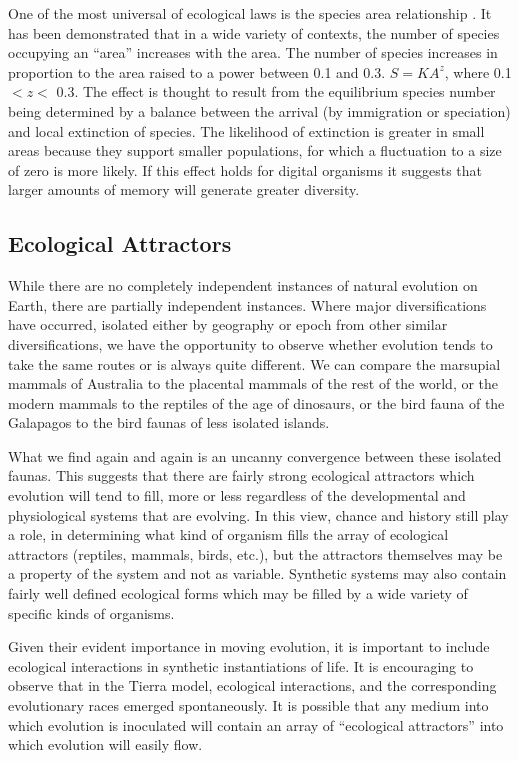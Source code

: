 One of the most universal of ecological laws is the species area relationship
\cite{MaWi}.  It has been demonstrated that in a wide variety of contexts,
the number of species occupying an ``area'' increases with the area.
The number of species increases in proportion to the area raised to a
power between 0.1 and 0.3.  $S = KA^{z}$, where 0.1 $< z <$ 0.3.  The
effect is thought to result from the equilibrium species number being
determined by a balance between the arrival (by immigration or speciation)
and local extinction of species.  The likelihood of extinction is greater
in small areas because they support smaller populations, for which a
fluctuation to a size of zero is more likely.  If this effect holds
for digital organisms it suggests that larger amounts of memory will
generate greater diversity.

\subsection{Ecological Attractors}

While there are no completely independent instances of natural evolution
on Earth, there are partially independent instances.  Where major
diversifications have occurred, isolated either by geography or epoch
from other similar diversifications, we have the opportunity to observe
whether evolution tends to take the same routes or is always quite
different.  We can compare the marsupial mammals of Australia to the
placental mammals of the rest of the world, or the modern mammals to
the reptiles of the age of dinosaurs, or the bird fauna of the Galapagos
to the bird faunas of less isolated islands.

What we find again and again is an uncanny convergence between these
isolated faunas.  This suggests that there are fairly strong ecological
attractors which evolution will tend to fill, more or less regardless
of the developmental and physiological systems that are evolving.
In this view, chance and history still play a role, in determining
what kind of organism fills the array of ecological attractors
(reptiles, mammals, birds, etc.), but the attractors themselves may
be a property of the system and not as variable.  Synthetic systems
may also contain fairly well defined ecological forms which may
be filled by a wide variety of specific kinds of organisms.

Given their evident importance in moving evolution, it is important
to include ecological interactions in synthetic instantiations of
life.  It is encouraging to observe that in the Tierra model, ecological
interactions, and the corresponding evolutionary races emerged
spontaneously.  It is possible that any medium into which evolution
is inoculated will contain an array of ``ecological attractors'' into
which evolution will easily flow.

